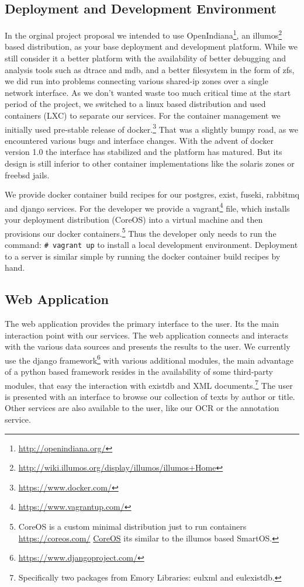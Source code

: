 \documentclass[12pt, draft]{article}
\begin{document}
\subsection{Deployment and Development Environment}

In the orginal project proposal we intended to use OpenIndiana\footnote{\url{http://openindiana.org/}},
an illumos\footnote{\url{http://wiki.illumos.org/display/illumos/illumos+Home}}
 based distribution, as your base deployment and development
platform.
While we still consider it a better platform with
the availability of better debugging and analysis tools
such as dtrace and mdb, and a better filesystem in the form of zfs,
we did run into problems connecting various shared-ip zones over a single network interface.
As we don't wanted waste too much critical time at the
start period of the project, we switched to a linux based
distribution and used containers (LXC) to separate our
services.  For the container management we initially
used pre-stable release of docker.\footnote{\url{https://www.docker.com/}}
That was a slightly
bumpy road, as we encountered various bugs and interface changes.
With the advent of docker version 1.0 the interface has
stabilized and the platform has matured.
But its design is still inferior to other
container implementations like the solaris zones or freebsd jails.

We provide docker container build recipes for our
postgres, exist, fuseki, rabbitmq and django services.
For the developer we provide a vagrant\footnote{\url{https://www.vagrantup.com/}}
 file, which 
installs your deployment distribution (CoreOS)
into a virtual machine and then provisions our
docker containers.\footnote{CoreOS is a custom minimal distribution just to run
containers \url{https://coreos.com/} \href{https://coreos.com/}{CoreOS} its similar to the illumos based SmartOS.}
Thus the developer only needs to run the command: \lstinline´# vagrant up´
to install a local development environment.
Deployment to a server is similar simple by running the docker container build recipes
by hand.

\subsection{Web Application}

The web application provides the primary interface to the user. Its the main
interaction point with our services.
The web application connects and interacts with the various data sources and presents
the results to the user.
We currently use the django framework\footnote{\url{https://www.djangoproject.com/}}
 with various additional modules,
the main advantage of a python based framework resides in the availability
of some third-party modules, that easy the interaction with existdb and XML
documents.\footnote{Specifically two packages from Emory Libraries: eulxml and eulexistdb.}
The user is presented with an interface to browse our collection of texts by
author or title.  Other services are also available to the user, like our
OCR or the annotation service.
\end{document}
